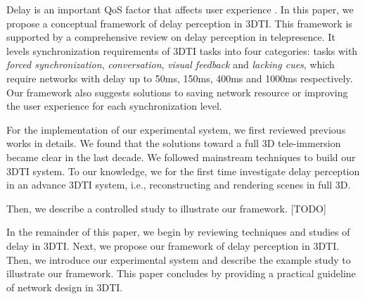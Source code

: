 Delay is an important QoS factor that affects user experience \cite{brunnstrom2013qualinet, schmitt2014asymmetric, schmitt2013qoe}. In this paper, we propose a conceptual framework of delay perception in 3DTI. This framework is supported by a comprehensive review on delay perception in telepresence. It levels synchronization requirements of 3DTI tasks into four categories: tasks with \emph{forced synchronization}, \emph{conversation}, \emph{visual feedback} and \emph{lacking cues}, which require networks with delay up to 50ms, 150ms, 400ms and 1000ms respectively. Our framework also suggests solutions to saving network resource or improving the user experience for each synchronization level.


For the implementation of our experimental system, we first reviewed previous works in details. We found that the solutions toward a full 3D tele-immersion became clear in the last decade. We followed mainstream techniques to build our 3DTI system. To our knowledge, we for the first time investigate delay perception in an advance 3DTI system, i.e., reconstructing and rendering scenes in full 3D.

Then, we describe a controlled study to illustrate our framework. [TODO]


In the remainder of this paper, we begin by reviewing techniques and studies of delay in 3DTI. Next, we propose our framework of delay perception in 3DTI. Then, we introduce our experimental system and describe the example study to illustrate our framework. This paper concludes by providing a practical guideline of network design in 3DTI.
